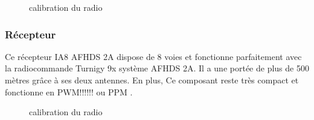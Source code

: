 	\begin{figure} [h]
		\begin{center}
			\centering
		\end{center}
		\caption{calibration du radio}
	\end{figure}
	\subsubsection{Récepteur }
	Ce récepteur IA8 AFHDS 2A dispose de 8 voies et fonctionne parfaitement avec la radiocommande Turnigy 9x système AFHDS 2A. Il a une portée de plus de 500 mètres  grâce à ses deux antennes. En plus, Ce composant reste très compact et fonctionne en PWM!!!!!! ou PPM .
	\begin{figure} [h]
		\begin{center}
			\centering
		\end{center}
		\caption{calibration du radio}
	\end{figure}

